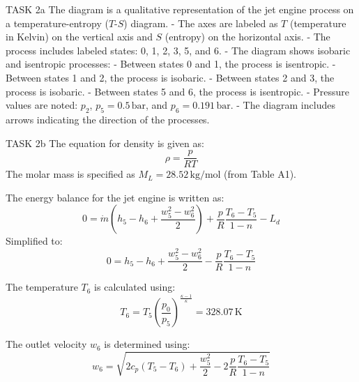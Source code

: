 TASK 2a  
The diagram is a qualitative representation of the jet engine process on a temperature-entropy (\(T\)-\(S\)) diagram.  
- The axes are labeled as \(T\) (temperature in Kelvin) on the vertical axis and \(S\) (entropy) on the horizontal axis.  
- The process includes labeled states: 0, 1, 2, 3, 5, and 6.  
- The diagram shows isobaric and isentropic processes:  
  - Between states 0 and 1, the process is isentropic.  
  - Between states 1 and 2, the process is isobaric.  
  - Between states 2 and 3, the process is isobaric.  
  - Between states 5 and 6, the process is isentropic.  
- Pressure values are noted: \(p_2\), \(p_5 = 0.5 \, \text{bar}\), and \(p_6 = 0.191 \, \text{bar}\).  
- The diagram includes arrows indicating the direction of the processes.  

TASK 2b  
The equation for density is given as:  
\[
\rho = \frac{p}{R T}
\]  
The molar mass is specified as \(M_L = 28.52 \, \text{kg/mol}\) (from Table A1).  

The energy balance for the jet engine is written as:  
\[
0 = \dot{m} \left( h_5 - h_6 + \frac{w_5^2 - w_6^2}{2} \right) + \frac{p}{R} \frac{T_6 - T_5}{1 - n} - L_{d}
\]  
Simplified to:  
\[
0 = h_5 - h_6 + \frac{w_5^2 - w_6^2}{2} - \frac{p}{R} \frac{T_6 - T_5}{1 - n}
\]  

The temperature \(T_6\) is calculated using:  
\[
T_6 = T_5 \left( \frac{p_0}{p_5} \right)^{\frac{\kappa - 1}{\kappa}} = 328.07 \, \text{K}
\]  

The outlet velocity \(w_6\) is determined using:  
\[
w_6 = \sqrt{2 c_p (T_5 - T_6) + \frac{w_5^2}{2} - 2 \frac{p}{R} \frac{T_6 - T_5}{1 - n}}
\]